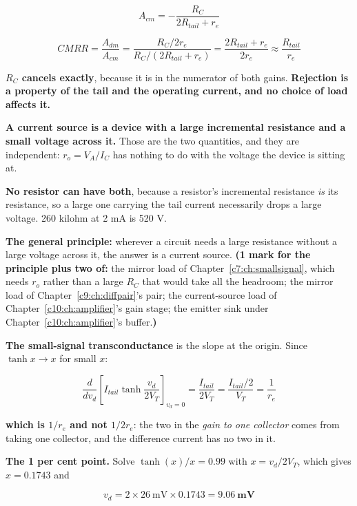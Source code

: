 \[
  A_{cm} = -\frac{R_C}{2R_{tail} + r_e}
\]

\[
  CMRR = \frac{A_{dm}}{A_{cm}}
  = \frac{R_C/2r_e}{R_C/(2R_{tail} + r_e)} = \frac{2R_{tail} + r_e}{2r_e}
  \approx \frac{R_{tail}}{r_e}
\]

\textbf{$R_C$ cancels exactly}, because it is in the numerator of both gains. \textbf{Rejection is a property of the tail and the operating current, and no choice of load affects it.}


\textbf{A current source is a device with a large incremental resistance and a small voltage across it.} Those are the two quantities, and they are independent: $r_o = V_A/I_C$ has nothing to do with the voltage the device is sitting at.

\textbf{No resistor can have both}, because a resistor's incremental resistance \emph{is} its resistance, so a large one carrying the tail current necessarily drops a large voltage. 260 kilohm at 2 mA is 520 V.

\textbf{The general principle:} wherever a circuit needs a large resistance without a large voltage across it, the answer is a current source. \textbf{(1 mark for the principle plus two of:} the mirror load of Chapter~\ref{c7:ch:smallsignal}, which needs $r_o$ rather than a large $R_C$ that would take all the headroom; the mirror load of Chapter~\ref{c9:ch:diffpair}'s pair; the current-source load of Chapter~\ref{c10:ch:amplifier}'s gain stage; the emitter sink under Chapter~\ref{c10:ch:amplifier}'s buffer.\textbf{)}


\textbf{The small-signal transconductance} is the slope at the origin. Since $\tanh x \to x$ for small $x$:

\[
  \frac{d}{dv_d}\left[I_{tail}\tanh\frac{v_d}{2V_T}\right]_{v_d=0}
  = \frac{I_{tail}}{2V_T} = \frac{I_{tail}/2}{V_T} = \frac{1}{r_e}
\]

\textbf{which is $1/r_e$ and not $1/2r_e$}: the two in the \emph{gain to one collector} comes from taking one collector, and the difference current has no two in it.

\textbf{The 1 per cent point.} Solve $\tanh(x)/x = 0.99$ with $x = v_d/2V_T$, which gives $x = 0.1743$ and

\[
  v_d = 2 \times 26\ \text{mV} \times 0.1743 = \mathbf{9.06\ \text{mV}}
\]

